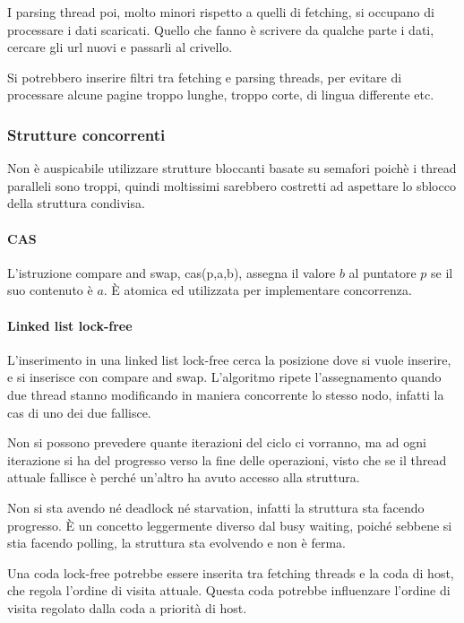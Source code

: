 I parsing thread poi, molto minori rispetto a quelli di fetching, 
si occupano di processare i dati scaricati.
Quello che fanno è scrivere da qualche parte i dati, cercare gli 
url nuovi e passarli al crivello.

\begin{remark}
    Si potrebbero inserire filtri tra fetching e parsing threads, per evitare 
    di processare alcune pagine troppo lunghe, troppo corte, di lingua differente etc.
\end{remark}

\subsubsection{Strutture concorrenti}

Non è auspicabile utilizzare strutture bloccanti basate su semafori poichè i thread 
paralleli sono troppi, quindi moltissimi sarebbero costretti ad aspettare lo 
sblocco della struttura condivisa.

\paragraph{CAS}
L'istruzione compare and swap, cas(p,a,b), assegna il valore $b$ al puntatore $p$ se il suo contenuto è $a$. È atomica ed utilizzata per implementare concorrenza.

\paragraph{Linked list lock-free}
L'inserimento in una linked list lock-free cerca la posizione dove si vuole inserire, e si inserisce con compare and swap.
L'algoritmo ripete l'assegnamento quando due thread stanno modificando in maniera 
concorrente lo stesso nodo, infatti la cas di uno dei due fallisce.

Non si possono prevedere quante iterazioni del ciclo ci vorranno, ma ad ogni 
iterazione si ha del progresso verso la fine delle operazioni, visto che se il thread 
attuale fallisce è perché un'altro ha avuto accesso alla struttura.

Non si sta avendo né deadlock né starvation, infatti la struttura sta facendo progresso. 
È un concetto leggermente diverso dal busy waiting, poiché sebbene si stia facendo polling, la struttura sta evolvendo e non è ferma.

\begin{remark}
    Una coda lock-free potrebbe essere inserita tra fetching threads e la coda di host, 
    che regola l'ordine di visita attuale. Questa coda potrebbe influenzare l'ordine 
    di visita regolato dalla coda a priorità di host.
\end{remark}


